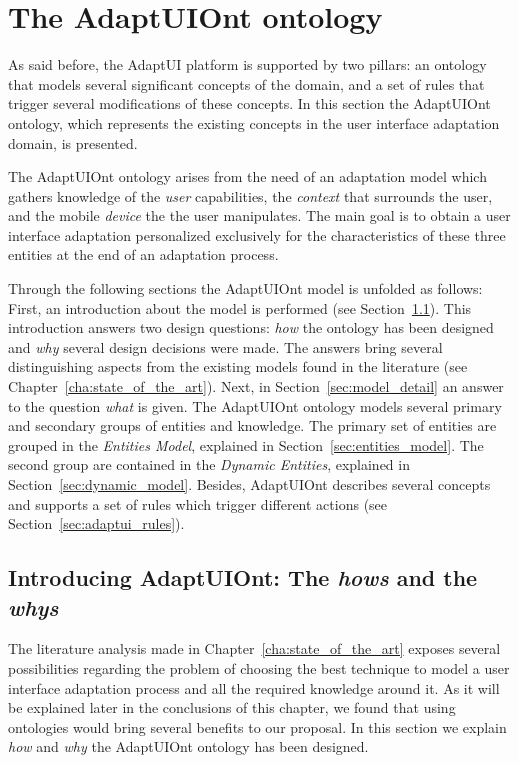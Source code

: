 \section{The AdaptUIOnt ontology}
\label{sec:adaptui_model}

As said before, the AdaptUI platform is supported by two pillars: an ontology
that models several significant concepts of the domain, and a set of rules
that trigger several modifications of these concepts. In this section the
AdaptUIOnt ontology, which represents the existing concepts in the user
interface adaptation domain, is presented.
  
The AdaptUIOnt ontology arises from the need of an adaptation model which gathers
knowledge of the \textit{user} capabilities, the \textit{context} that surrounds
the user, and the mobile \textit{device} the the user manipulates. The main goal
is to obtain a user interface adaptation personalized exclusively for the
characteristics of these three entities at the end of an adaptation process.

Through the following sections the AdaptUIOnt model is unfolded as follows: 
First, an introduction about the model is performed (see Section~\ref{sec:model_introduction}).
This introduction answers two design questions: \textit{how} the ontology has
been designed and \textit{why} several design decisions were made. The answers
bring several distinguishing aspects from the existing models found in the
literature (see Chapter~\ref{cha:state_of_the_art}). Next, in Section~\ref{sec:model_detail}
an answer to the question \textit{what} is given. The AdaptUIOnt ontology models
several primary and secondary groups of entities and knowledge. The primary
set of entities are grouped in the \textit{Entities Model}, explained in
Section~\ref{sec:entities_model}. The second group are contained in the
\textit{Dynamic Entities}, explained in Section~\ref{sec:dynamic_model}. Besides,
AdaptUIOnt describes several concepts and supports a set of rules which trigger
different actions (see Section~\ref{sec:adaptui_rules}).


\subsection{Introducing AdaptUIOnt: The \textit{hows} and the \textit{whys}}
\label{sec:model_introduction}

The literature analysis made in Chapter~\ref{cha:state_of_the_art} exposes
several possibilities regarding the problem of choosing the best technique
to model a user interface adaptation process and all the required knowledge
around it. As it will be explained later in the conclusions of this chapter, we
found that using ontologies would bring several benefits to our proposal. In 
this section we explain \textit{how} and \textit{why} the AdaptUIOnt ontology 
has been designed.

